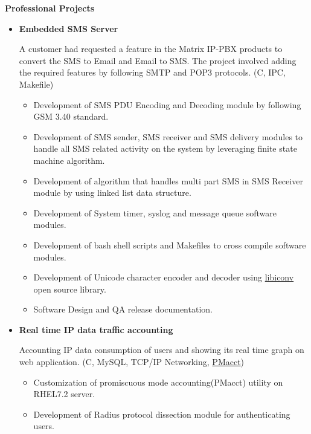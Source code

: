 \documentclass[letterpaper,10pt]{article}
\newcommand{\resitem}[1]{\item #1 \vspace{-2pt}}
\newcommand{\resheading}[1]{{\large \colorbox{mygrey}{\begin{minipage}{\textwidth}{\textbf{#1 \vphantom{p\^{E}}}}\end{minipage}}}}
\begin{document}
\resheading{Professional Projects}
\begin{itemize}

\item
    \textbf{Embedded SMS Server}
    
    A customer had requested a feature in the Matrix IP-PBX products to convert the SMS to Email and Email to SMS. The project involved adding the required features by following SMTP and POP3 protocols. (C, IPC, Makefile)

	\begin{itemize}
		\resitem{Development of SMS PDU Encoding and Decoding module by following GSM 3.40 standard.}
		
		\resitem{Development of SMS sender, SMS receiver and SMS delivery modules to handle all SMS related activity on the system by leveraging finite state machine algorithm.}
	    
	    \resitem{Development of algorithm that handles multi part SMS in SMS Receiver module by using linked list data structure.}
	    
	    \resitem{Development of System timer, syslog and message queue software modules.}
	    
	    \resitem{Development of bash shell scripts and Makefiles to cross compile software modules.}
        
        \resitem{Development of Unicode character encoder and decoder using \href{https://github.com/bnoordhuis/libiconv}{libiconv} open source library.}
        
        \resitem{Software Design and QA release documentation.}
		
	\end{itemize}
	
\item
    \textbf{Real time IP data traffic accounting}
    
    Accounting IP data consumption of users and showing its real time graph on web application. (C, MySQL, TCP/IP Networking, \href{https://github.com/mehul-m-prajapati/pmacct}{PMacct})
    
	\begin{itemize}
	    \resitem{Customization of promiscuous mode accounting(PMacct) utility on RHEL7.2 server.}
	
	    \resitem{Development of Radius protocol dissection module for authenticating users.}
		

\end{itemize}
\end{itemize}
\end{document}

